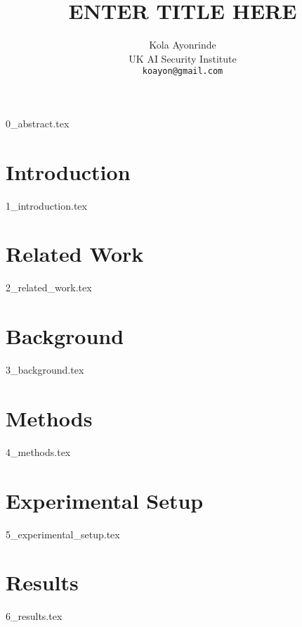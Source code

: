 \documentclass{article} %
\title{ENTER TITLE HERE}
\author{{\hspace{1mm}Kola Ayonrinde} \\
        UK AI Security Institute \\
	\texttt{koayon@gmail.com} \\
}
\begin{document}
\maketitle





{0_abstract.tex}

\section{Introduction}
\label{sec:intro}
{1_introduction.tex}


\section{Related Work}
\label{sec:related_work}
{2_related_work.tex}

\section{Background}
\label{sec:background}
{3_background.tex}

\section{Methods}
\label{sec:methods}
{4_methods.tex}


\hypertarget{setup}{%
\section{Experimental Setup}\label{setup}}
{5_experimental_setup.tex}

\section{Results}
\label{sec:results}
{6_results.tex}
\end{document}
